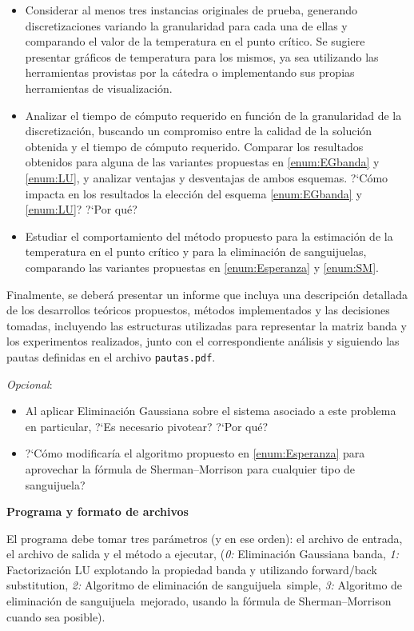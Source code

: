 \documentclass[11pt, a4paper]{article}
\newcommand{\atacante}{sanguijuela}
\begin{document}
\begin{itemize}
\item Considerar al menos tres instancias originales de prueba, generando discretizaciones variando la granularidad para cada una de ellas y comparando el valor de la temperatura en el punto cr\'itico. Se sugiere presentar gr\'aficos de temperatura para los mismos, ya sea utilizando las herramientas provistas por la c\'atedra o implementando sus propias herramientas de visualizaci\'on.
\item Analizar el tiempo de c\'omputo requerido en funci\'on de la granularidad de la discretizaci\'on, buscando un compromiso entre la calidad de la soluci\'on obtenida y el tiempo de c\'omputo requerido. Comparar los resultados obtenidos para alguna de las variantes propuestas en \ref{enum:EGbanda} y \ref{enum:LU}, y analizar ventajas y desventajas de ambos esquemas. ?`Cómo impacta en los resultados la elección del esquema \ref{enum:EGbanda} y \ref{enum:LU}? ?`Por qué?
\item Estudiar el comportamiento del m\'etodo propuesto para la estimaci\'on de la temperatura en el punto cr\'itico y para la eliminaci\'on de \atacante s, comparando las variantes propuestas en \ref{enum:Esperanza} y \ref{enum:SM}.
\end{itemize}

Finalmente, se deber\'a presentar un informe que incluya una descripci\'on detallada de los desarrollos teóricos propuestos, m\'etodos implementados y las decisiones tomadas, incluyendo las estructuras utilizadas para representar la matriz banda  y los experimentos realizados, junto con el correspondiente an\'alisis y siguiendo las pautas definidas en el archivo \verb+pautas.pdf+.

\textit{Opcional}:
\vspace*{-0.3cm}
\begin{itemize}
	\item Al aplicar Eliminación Gaussiana sobre el sistema asociado a este problema en particular, ?`Es necesario pivotear? ?`Por qu\'e?
	\item ?`Cómo modificaría el algoritmo propuesto en \ref{enum:Esperanza} para aprovechar la fórmula de Sherman–Morrison \cite{ShermanMorrison} para cualquier tipo de \atacante ?
\end{itemize}

{\noindent \bf Programa y formato de archivos}

El programa debe tomar tres par\'ametros (y en ese orden): el archivo de entrada, el archivo de salida y el m\'etodo a ejecutar, (\emph{0:} Eliminación Gaussiana banda, \emph{1:} Factorización LU explotando la propiedad banda y utilizando forward/back substitution, \emph{2:} Algoritmo de eliminación de \atacante\ simple, \emph{3:} Algoritmo de eliminación de \atacante\ mejorado, usando la fórmula de Sherman–Morrison cuando sea posible).
\end{document}
